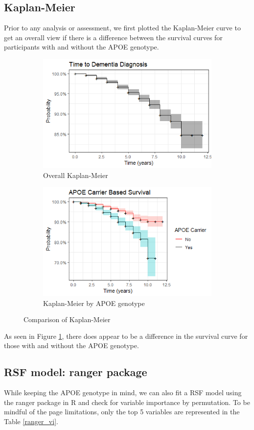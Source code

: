 \documentclass[a4paper,man,natbib,11pt]{article}
\begin{document}
\subsection{Kaplan-Meier}

Prior to any analysis or assessment, we first plotted the Kaplan-Meier curve to get an overall view if there is a difference between the survival curves for participants with and without the APOE genotype. 

\begin{figure}[h!]
\centering
\begin{subfigure}{.5\textwidth}
  \centering
  \includegraphics[width=0.5\linewidth]{figures/KM1.png}
  \caption{Overall Kaplan-Meier}
\end{subfigure}%
\begin{subfigure}{.5\textwidth}
  \centering
  \includegraphics[width=0.5\linewidth]{figures/KM2.png}
  \caption{Kaplan-Meier by APOE genotype}
\end{subfigure}
\caption{Comparison of Kaplan-Meier}
\label{fig:KM}
\end{figure}

As seen in Figure \ref{fig:KM}, there does appear to be a difference in the survival curve for those with and without the APOE genotype.

\subsection{RSF model: ranger package}

While keeping the APOE genotype in mind, we can also fit a RSF model using the ranger package in R and check for variable importance by permutation. To be mindful of the page limitations, only the top 5 variables are represented in the Table \ref{ranger_vi}. 
\end{document}
